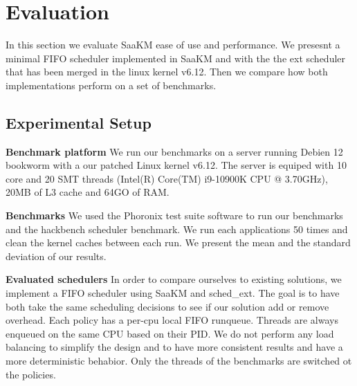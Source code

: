 
\section{Evaluation}

In this section we evaluate SaaKM ease of use and performance. We presesnt a minimal FIFO scheduler implemented in SaaKM and with the the ext scheduler\cite{schedext} that has been merged in the linux kernel v6.12. Then we compare how both implementations perform on a set of benchmarks. 

\subsection{Experimental Setup}
\textbf{Benchmark platform} We run our benchmarks on a server running Debien 12 bookworm with a our patched Linux kernel v6.12. The server is equiped with 10 core and 20 SMT threads (Intel(R) Core(TM) i9-10900K CPU @ 3.70GHz), 20MB of L3 cache and 64GO of RAM. 

\textbf{Benchmarks} We used the Phoronix test suite\cite{phoronix} software to run our benchmarks and the hackbench\cite{hackbench} scheduler benchmark. We run each applications 50 times and clean the kernel caches between each run. We present the mean and the standard deviation of our results. 

\textbf{Evaluated schedulers} In order to compare ourselves to existing solutions, we implement a FIFO scheduler using SaaKM and sched\_ext. The goal is to have both take the same scheduling decisions to see if our solution add or remove overhead. Each policy has a per-cpu local FIFO runqueue. Threads are always enqueued on the same CPU based on their PID. We do not perform any load balancing to simplify the design and to have more consistent results and have a more deterministic behabior. Only the threads of the benchmarks are switched ot the policies.


